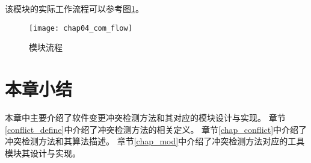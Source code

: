该模块的实际工作流程可以参考图\ref {com_flow}。

\begin{figure}[H]
	\centering
	\texttt{[image: chap04\_com\_flow]}
	\caption {模块流程}
	\label {com_flow}	
\end{figure}

\section{本章小结}

本章中主要介绍了软件变更冲突检测方法和其对应的模块设计与实现。
章节\ref {conflict_define}中介绍了冲突检测方法的相关定义。
章节\ref {chap_conflict}中介绍了冲突检测方法和其算法描述。
章节\ref {chap_mod}中介绍了冲突检测方法对应的工具模块其设计与实现。